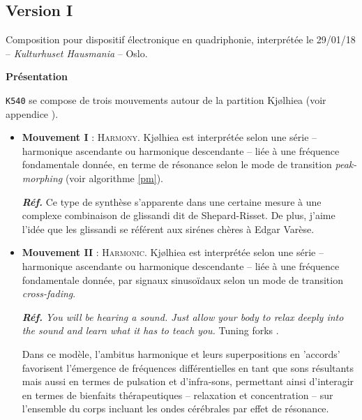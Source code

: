 \subsection[\texttt{v.I}]{Version I}

\smallskip

Composition pour dispositif \'electronique en quadriphonie, 
interpr\'et\'ee le 29/01/18 -- \textit{Kulturhuset Hausmania} -- Oslo.

\bigskip

\noindent \textbf{{\large Pr\'esentation}}
\hrulefill

\bigskip

\texttt{K540} se compose de trois mouvements autour de la partition Kj{\o}lhiea (voir appendice ).

\begin{itemize}[leftmargin=0.4in]
\item \textbf{Mouvement I} : \textsc{Harmony}. Kj{\o}lhiea est interpr\'et\'ee selon une s\'erie -- harmonique ascendante ou harmonique descendante 
 -- li\'ee \`a une fr\'equence fondamentale donn\'ee, en terme de r\'esonance selon le mode de transition \textsl{peak-morphing} (voir algorithme \ref{pm}).

\textbf{\textit{R\'ef.}} Ce type de synth\`ese s'apparente dans une certaine mesure \`a une complexe combinaison de glissandi dit de Shepard-Risset. De plus, j'aime l'id\'ee que les glissandi se r\'ef\'erent aux sir\'enes ch\`eres \`a Edgar Var\`ese.
 \end{itemize}

\begin{itemize}[leftmargin=0.4in]
\item \textbf{Mouvement II} : \textsc{Harmonic}. Kj{\o}lhiea est interpr\'et\'ee selon une s\'erie -- harmonique ascendante ou harmonique descendante 
 -- li\'ee \`a une fr\'equence fondamentale donn\'ee, par signaux sinuso\"idaux selon un mode de transition \textsl{cross-fading}.

\textbf{\textit{R\'ef.}} \textit{You will be hearing a sound. Just allow your body to relax deeply into the sound and learn what it has to teach you.} Tuning forks \citep[pp. 89--99]{hm}.

Dans ce  mod\`ele, 
l'ambitus harmonique et leurs superpositions en 'accords' favorisent l'\'emergence de fr\'equences diff\'erentielles en tant que sons r\'esultants mais aussi en termes de pulsation et d'infra-sons,  permettant ainsi d'interagir en termes de bienfaits th\'erapeutiques -- relaxation et concentration -- sur l'ensemble du corps incluant les ondes c\'er\'ebrales \citep{ocm} par effet de r\'esonance.
 \end{itemize}


